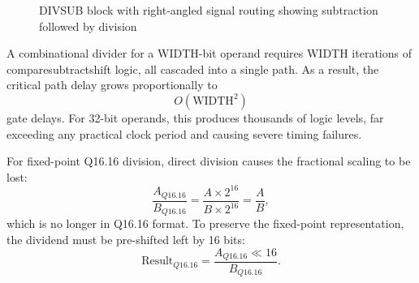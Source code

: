 \documentclass[a4paper,12pt]{article}
\begin{document}
\begin{figure}[h]
\centering
{}
\caption{DIVSUB block with right-angled signal routing showing subtraction followed by division}
\end{figure}

A combinational divider for a WIDTH-bit operand requires WIDTH iterations of compare\-subtract\-shift logic, all cascaded into a single path. As a result, the critical path delay grows proportionally to
\begin{equation}
O(\text{WIDTH}^2)
\end{equation}
gate delays. For 32-bit operands, this produces thousands of logic levels, far exceeding any practical clock period and causing severe timing failures.

For fixed-point Q16.16 division, direct division causes the fractional scaling to be lost:
\begin{equation}
\frac{A_{Q16.16}}{B_{Q16.16}} = \frac{A \times 2^{16}}{B \times 2^{16}} = \frac{A}{B},
\end{equation}
which is no longer in Q16.16 format. To preserve the fixed-point representation, the dividend must be pre-shifted left by 16 bits:
\begin{equation}
\text{Result}_{Q16.16} = \frac{A_{Q16.16} \ll 16}{B_{Q16.16}}.
\end{equation}
\end{document}
